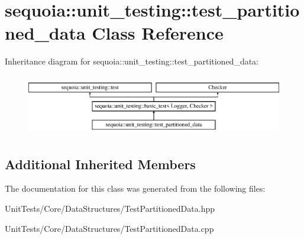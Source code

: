 \hypertarget{classsequoia_1_1unit__testing_1_1test__partitioned__data}{}\section{sequoia\+::unit\+\_\+testing\+::test\+\_\+partitioned\+\_\+data Class Reference}
\label{classsequoia_1_1unit__testing_1_1test__partitioned__data}
Inheritance diagram for sequoia\+::unit\+\_\+testing\+::test\+\_\+partitioned\+\_\+data\+:\begin{figure}[H]
\begin{center}
\leavevmode
\includegraphics[height=2.666667cm]{classsequoia_1_1unit__testing_1_1test__partitioned__data}
\end{center}
\end{figure}
\subsection*{Additional Inherited Members}


The documentation for this class was generated from the following files\+:\begin{DoxyCompactItemize}
\item 
Unit\+Tests/\+Core/\+Data\+Structures/Test\+Partitioned\+Data.\+hpp\item 
Unit\+Tests/\+Core/\+Data\+Structures/Test\+Partitioned\+Data.\+cpp\end{DoxyCompactItemize}
